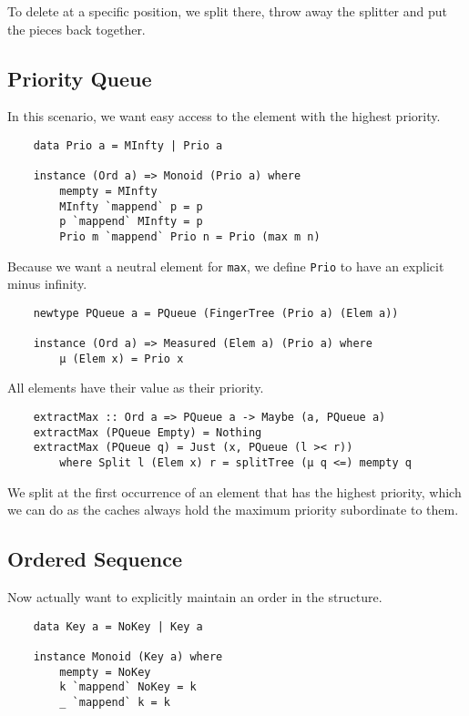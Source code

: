 To delete at a specific position, we split there, throw away the splitter and put the pieces back together.

\subsection{Priority Queue}

In this scenario, we want easy access to the element with the highest priority.

\begin{verbatim}
    data Prio a = MInfty | Prio a

    instance (Ord a) => Monoid (Prio a) where
        mempty = MInfty
        MInfty `mappend` p = p
        p `mappend` MInfty = p
        Prio m `mappend` Prio n = Prio (max m n)
\end{verbatim}

Because we want a neutral element for \texttt{max}, we define \texttt{Prio} to have an explicit minus infinity.

\begin{verbatim}
    newtype PQueue a = PQueue (FingerTree (Prio a) (Elem a))

    instance (Ord a) => Measured (Elem a) (Prio a) where
        μ (Elem x) = Prio x
\end{verbatim}

All elements have their value as their priority.

\begin{verbatim}
    extractMax :: Ord a => PQueue a -> Maybe (a, PQueue a)
    extractMax (PQueue Empty) = Nothing
    extractMax (PQueue q) = Just (x, PQueue (l >< r))
        where Split l (Elem x) r = splitTree (μ q <=) mempty q
\end{verbatim}

We split at the first occurrence of an element that has the highest priority, which we can do as the caches always hold the maximum priority subordinate to them.

\subsection{Ordered Sequence}

Now actually want to explicitly maintain an order in the structure.

\begin{verbatim}
    data Key a = NoKey | Key a

    instance Monoid (Key a) where
        mempty = NoKey
        k `mappend` NoKey = k
        _ `mappend` k = k
\end{verbatim}

